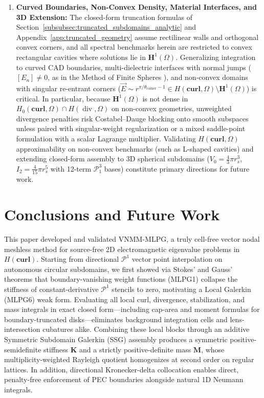 \documentclass[VANCOUVER]{USG}
\begin{document}
\begin{enumerate}
    \item \textbf{Curved Boundaries, Non-Convex Density, Material Interfaces, and 3D Extension:} The closed-form truncation formulas of Section~\ref{subsubsec:truncated_subdomains_analytic} and Appendix~\ref{app:truncated_geometry} assume rectilinear walls and orthogonal convex corners, and all spectral benchmarks herein are restricted to convex rectangular cavities where solutions lie in $\mathbf{H}^1(\Omega)$. Generalizing integration to curved CAD boundaries, multi-dielectric interfaces with normal jumps ($[E_n] \ne 0$, as in the Method of Finite Spheres \cite{nicomedes2021acoustic}), and non-convex domains with singular re-entrant corners ($\vec{E} \sim r^{\pi/\theta_{\mathrm{corner}} - 1} \in H(\mathbf{curl},\Omega) \setminus \mathbf{H}^1(\Omega)$) is critical. In particular, because $\mathbf{H}^1(\Omega)$ is not dense in $H_0(\mathbf{curl},\Omega) \cap H(\operatorname{div},\Omega)$ on non-convex geometries, unweighted divergence penalties risk Costabel--Dauge blocking onto smooth subspaces unless paired with singular-weight regularization \cite{costabel2002weighted} or a mixed saddle-point formulation with a scalar Lagrange multiplier. Validating $H(\mathbf{curl},\Omega)$ approximability on non-convex benchmarks (such as L-shaped cavities) and extending closed-form assembly to 3D spherical subdomains ($V_0 = \frac{4}{3}\pi r_s^3$, $I_2 = \frac{4}{15}\pi r_s^5$ with 12-term $\mathcal{P}_1^3$ bases) constitute primary directions for future work.
\end{enumerate}

\section{Conclusions and Future Work}
\label{sec:conclusions}

This paper developed and validated VNMM-MLPG, a truly cell-free vector nodal meshless method for source-free 2D electromagnetic eigenvalue problems in $H(\mathbf{curl})$. Starting from directional $\mathcal{P}^1$ vector point interpolation on autonomous circular subdomains, we first showed via Stokes' and Gauss' theorems that boundary-vanishing weight functions (MLPG1) collapse the stiffness of constant-derivative $\mathcal{P}^1$ stencils to zero, motivating a Local Galerkin (MLPG6) weak form. Evaluating all local curl, divergence, stabilization, and mass integrals in exact closed form---including cap-area and moment formulas for boundary-truncated disks---eliminates background integration cells and lens-intersection cubatures alike. Combining these local blocks through an additive Symmetric Subdomain Galerkin (SSG) assembly produces a symmetric positive-semidefinite stiffness $\mathbf{K}$ and a strictly positive-definite mass $\mathbf{M}$, whose multiplicity-weighted Rayleigh quotient homogenizes at second order on regular lattices. In addition, directional Kronecker-delta collocation enables direct, penalty-free enforcement of PEC boundaries alongside natural 1D Neumann integrals.
\end{document}
